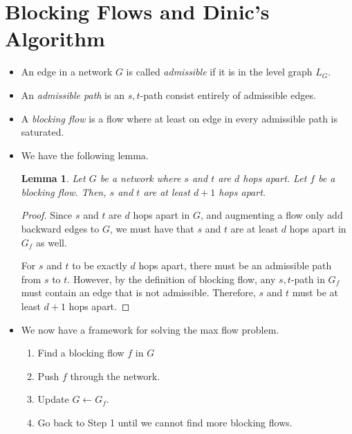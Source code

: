 \documentclass[10pt]{article}
\newtheorem{lemma}{Lemma}[section]
\begin{document}
  \section{Blocking Flows and Dinic's Algorithm} %
  \label{sec:blocking_flows}  
    \begin{itemize}
      \item An edge in a network $G$ is called \emph{admissible}
        if it is in the level graph $L_G$.
        
      \item  An \emph{admissible path} is an $s,t$-path consist entirely
        of admissible edges.
      
      \item A \emph{blocking flow} is a flow where at least
        on edge in every admissible path is saturated.
      
      \item We have the following lemma.
      
        \begin{lemma}
          Let $G$ be a network where $s$ and $t$ are $d$ hops
          apart. Let $f$ be a blocking flow. Then, $s$ and $t$
          are at least $d+1$ hops apart.
        \end{lemma}
        
        \begin{proof}
          Since $s$ and $t$ are $d$ hops apart in $G$,
          and augmenting a flow only add backward edges 
          to $G$, we must have that $s$ and $t$ are at least
          $d$ hops apart in $G_f$ as well.
          
          For $s$ and $t$ to be exactly $d$ hops
          apart, there must be an admissible path from $s$
          to $t$. However, by the definition of blocking flow,
          any $s,t$-path in $G_f$ must 
          contain an edge that is not admissible.
          Therefore, $s$ and $t$ must be at least $d+1$
          hops apart. 
        \end{proof}
      
      \item We now have a framework for solving the max flow problem.
      
        \begin{enumerate}
          \item Find a blocking flow $f$ in $G$
          \item Push $f$ through the network.
          \item Update $G \gets G_f$.
          \item Go back to Step 1 until we cannot find more blocking flows.
        \end{enumerate}
        

\end{itemize}
\end{document}
